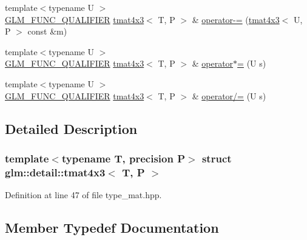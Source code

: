\begin{DoxyCompactItemize}
\item 
{\footnotesize template$<$typename U $>$ }\\\hyperlink{setup_8hpp_a33fdea6f91c5f834105f7415e2a64407}{G\+L\+M\+\_\+\+F\+U\+N\+C\+\_\+\+Q\+U\+A\+L\+I\+F\+I\+ER} \hyperlink{structglm_1_1detail_1_1tmat4x3}{tmat4x3}$<$ T, P $>$ \& \hyperlink{structglm_1_1detail_1_1tmat4x3_ae99d5b3f57c8ba0e43b95d50c3652e14}{operator-\/=} (\hyperlink{structglm_1_1detail_1_1tmat4x3}{tmat4x3}$<$ U, P $>$ const \&m)
\item 
{\footnotesize template$<$typename U $>$ }\\\hyperlink{setup_8hpp_a33fdea6f91c5f834105f7415e2a64407}{G\+L\+M\+\_\+\+F\+U\+N\+C\+\_\+\+Q\+U\+A\+L\+I\+F\+I\+ER} \hyperlink{structglm_1_1detail_1_1tmat4x3}{tmat4x3}$<$ T, P $>$ \& \hyperlink{structglm_1_1detail_1_1tmat4x3_a2a6ffe1017bd2b4d1b74d45d8d90e90e}{operator$\ast$=} (U s)
\item 
{\footnotesize template$<$typename U $>$ }\\\hyperlink{setup_8hpp_a33fdea6f91c5f834105f7415e2a64407}{G\+L\+M\+\_\+\+F\+U\+N\+C\+\_\+\+Q\+U\+A\+L\+I\+F\+I\+ER} \hyperlink{structglm_1_1detail_1_1tmat4x3}{tmat4x3}$<$ T, P $>$ \& \hyperlink{structglm_1_1detail_1_1tmat4x3_a990634b567ee79dbd2cfc3ea469e57fb}{operator/=} (U s)
\end{DoxyCompactItemize}


\subsection{Detailed Description}
\subsubsection*{template$<$typename T, precision P$>$\newline
struct glm\+::detail\+::tmat4x3$<$ T, P $>$}



Definition at line 47 of file type\+\_\+mat.\+hpp.



\subsection{Member Typedef Documentation}
\mbox{\label{structglm_1_1detail_1_1tmat4x3_a58afd510f7ab968e5a86e20f2f3979de}} 
